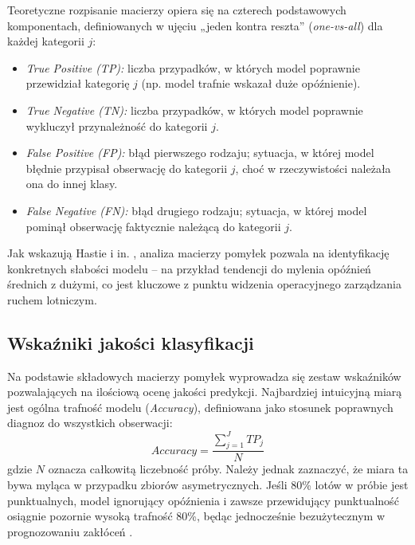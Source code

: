 Teoretyczne rozpisanie macierzy opiera się na czterech podstawowych komponentach, definiowanych w ujęciu „jeden kontra reszta” (\textit{one-vs-all}) dla każdej kategorii $j$:
\begin{itemize}
    \item \textit{True Positive (TP):} liczba przypadków, w których model poprawnie przewidział kategorię $j$ (np. model trafnie wskazał duże opóźnienie).
    \item \textit{True Negative (TN):} liczba przypadków, w których model poprawnie wykluczył przynależność do kategorii $j$.
    \item \textit{False Positive (FP):} błąd pierwszego rodzaju; sytuacja, w której model błędnie przypisał obserwację do kategorii $j$, choć w rzeczywistości należała ona do innej klasy.
    \item \textit{False Negative (FN):} błąd drugiego rodzaju; sytuacja, w której model pominął obserwację faktycznie należącą do kategorii $j$.
\end{itemize}

Jak wskazują Hastie i in. \cite{hastie2009}, analiza macierzy pomyłek pozwala na identyfikację konkretnych słabości modelu – na przykład tendencji do mylenia opóźnień średnich z dużymi, co jest kluczowe z punktu widzenia operacyjnego zarządzania ruchem lotniczym.

\subsection{Wskaźniki jakości klasyfikacji}

Na podstawie składowych macierzy pomyłek wyprowadza się zestaw wskaźników pozwalających na ilościową ocenę jakości predykcji. Najbardziej intuicyjną miarą jest ogólna trafność modelu (\textit{Accuracy}), definiowana jako stosunek poprawnych diagnoz do wszystkich obserwacji:
\begin{equation}
    Accuracy = \frac{\sum_{j=1}^{J} TP_j}{N}
\end{equation}
gdzie $N$ oznacza całkowitą liczebność próby. Należy jednak zaznaczyć, że miara ta bywa myląca w przypadku zbiorów asymetrycznych. Jeśli 80\% lotów w próbie jest punktualnych, model ignorujący opóźnienia i zawsze przewidujący punktualność osiągnie pozornie wysoką trafność 80\%, będąc jednocześnie bezużytecznym w prognozowaniu zakłóceń \cite{albassam2025}.

